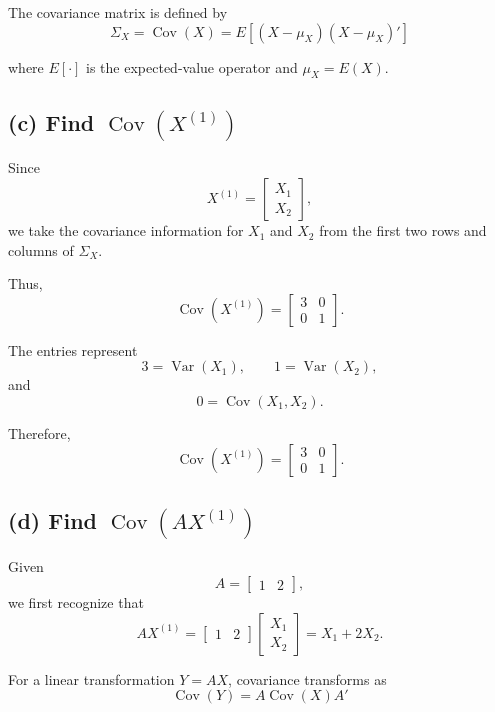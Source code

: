 \documentclass[12pt]{article}
\begin{document}
	The covariance matrix is defined by
	\[
	\boxed{
		\Sigma_X
		=
		\operatorname{Cov}(X)
		=
		E\left[(X-\mu_X)(X-\mu_X)'\right]
	}
	\]
	
	where $E[\cdot]$ is the expected-value operator and $\mu_X=E(X)$.
	
	\subsection*{(c) Find $\operatorname{Cov}(X^{(1)})$}
	
	Since
	\[
	X^{(1)}=
	\begin{bmatrix}
		X_1\\
		X_2
	\end{bmatrix},
	\]
	we take the covariance information for $X_1$ and $X_2$
	from the first two rows and columns of $\Sigma_X$.
	
	Thus,
	\[
	\operatorname{Cov}(X^{(1)})
	=
	\begin{bmatrix}
		3&0\\
		0&1
	\end{bmatrix}.
	\]
	
	The entries represent
	\[
	3=\operatorname{Var}(X_1),\qquad
	1=\operatorname{Var}(X_2),
	\]
	and
	\[
	0=\operatorname{Cov}(X_1,X_2).
	\]
	
	Therefore,
	\[
	\boxed{
		\operatorname{Cov}(X^{(1)})
		=
		\begin{bmatrix}
			3&0\\
			0&1
		\end{bmatrix}
	}.
	\]
	
	\subsection*{(d) Find $\operatorname{Cov}(AX^{(1)})$}
	
	Given
	\[
	A=
	\begin{bmatrix}
		1&2
	\end{bmatrix},
	\]
	we first recognize that
	\[
	AX^{(1)}
	=
	\begin{bmatrix}
		1&2
	\end{bmatrix}
	\begin{bmatrix}
		X_1\\
		X_2
	\end{bmatrix}
	=
	X_1+2X_2.
	\]
	
	For a linear transformation $Y=AX$, covariance transforms as
	\[
	\boxed{
		\operatorname{Cov}(Y)
		=
		A\operatorname{Cov}(X)A'
	}
	\]
	
\end{document}
